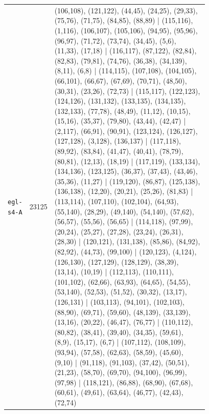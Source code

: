 \begin{landscape}
\begin{longtable}{lr>{\tiny\raggedright\arraybackslash}p{0.78\linewidth}}
\texttt{egl-s4-A} & 23125 & (106,108), (121,122), (44,45), (24,25), (29,33), (75,76), (71,75), (84,85), (88,89) | (115,116), (1,116), (106,107), (105,106), (94,95), (95,96), (96,97), (71,72), (73,74), (34,45), (5,6), (11,33), (17,18) | (116,117), (87,122), (82,84), (82,83), (79,81), (74,76), (36,38), (34,139), (8,11), (6,8) | (114,115), (107,108), (104,105), (66,101), (66,67), (67,69), (70,71), (48,50), (30,31), (23,26), (72,73) | (115,117), (122,123), (124,126), (131,132), (133,135), (134,135), (132,133), (77,78), (48,49), (11,12), (10,15), (15,16), (35,37), (79,80), (43,44), (42,47) | (2,117), (66,91), (90,91), (123,124), (126,127), (127,128), (3,128), (136,137) | (117,118), (89,92), (83,84), (41,47), (40,41), (78,79), (80,81), (12,13), (18,19) | (117,119), (133,134), (134,136), (123,125), (36,37), (37,43), (43,46), (35,36), (11,27) | (119,120), (86,87), (125,138), (136,138), (12,20), (20,21), (25,26), (81,83) | (113,114), (107,110), (102,104), (64,93), (55,140), (28,29), (49,140), (54,140), (57,62), (56,57), (55,56), (56,65) | (114,118), (97,99), (20,24), (25,27), (27,28), (23,24), (26,31), (28,30) | (120,121), (131,138), (85,86), (84,92), (82,92), (44,73), (99,100) | (120,123), (4,124), (126,130), (127,129), (128,129), (38,39), (13,14), (10,19) | (112,113), (110,111), (101,102), (62,66), (63,93), (64,65), (54,55), (53,140), (52,53), (51,52), (30,32), (13,17), (126,131) | (103,113), (94,101), (102,103), (88,90), (69,71), (59,60), (48,139), (33,139), (13,16), (20,22), (46,47), (76,77) | (110,112), (80,82), (38,41), (39,40), (34,35), (59,61), (8,9), (15,17), (6,7) | (107,112), (108,109), (93,94), (57,58), (62,63), (58,59), (45,60), (9,10) | (91,118), (91,103), (37,42), (50,51), (21,23), (58,70), (69,70), (94,100), (96,99), (97,98) | (118,121), (86,88), (68,90), (67,68), (60,61), (49,61), (63,64), (46,77), (42,43), (72,74) \\[2pt]

\end{longtable}
\end{landscape}
